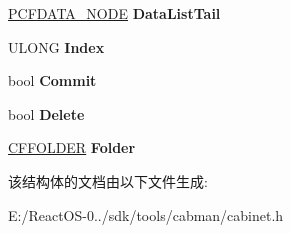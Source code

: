 \begin{DoxyCompactItemize}
\hyperlink{struct___c_f_d_a_t_a___n_o_d_e}{P\+C\+F\+D\+A\+T\+A\+\_\+\+N\+O\+DE} {\bfseries Data\+List\+Tail}
\item 
\mbox{\label{struct___c_f_f_o_l_d_e_r___n_o_d_e_abdbfefdfbc9cdb764c32a63bbae14ad3}} 
U\+L\+O\+NG {\bfseries Index}
\item 
\mbox{\label{struct___c_f_f_o_l_d_e_r___n_o_d_e_a08def76ff4a57b53ca34e2ece2af513f}} 
bool {\bfseries Commit}
\item 
\mbox{\label{struct___c_f_f_o_l_d_e_r___n_o_d_e_ae736b13172c79d61d482054450b75bd3}} 
bool {\bfseries Delete}
\item 
\mbox{\label{struct___c_f_f_o_l_d_e_r___n_o_d_e_abcc083f1c621aa8c9062742f1af9c4ad}} 
\hyperlink{struct_c_f_f_o_l_d_e_r}{C\+F\+F\+O\+L\+D\+ER} {\bfseries Folder}
\end{DoxyCompactItemize}


该结构体的文档由以下文件生成\+:\begin{DoxyCompactItemize}
\item 
E\+:/\+React\+O\+S-\/0../sdk/tools/cabman/cabinet.\+h\end{DoxyCompactItemize}
